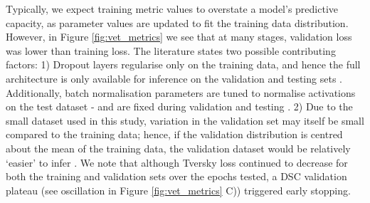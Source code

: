 Typically, we expect training metric values to overstate a model's predictive capacity, as parameter values are updated to fit the training data distribution. However, in Figure \ref{fig:vet_metrics} we see that at many stages, validation loss was lower than training loss.
The literature states two possible contributing factors: 1) Dropout layers regularise only on the training data, and hence the full architecture is only available for inference on the validation and testing sets \cite{srivastava2014}. Additionally, batch normalisation parameters are tuned to normalise activations on the test dataset - and are fixed during validation and testing \cite{CITATION}. 2) Due to the small dataset used in this study, variation in the validation set may itself be small compared to the training data; hence, if the validation distribution is centred about the mean of the training data, the validation dataset would be relatively `easier' to infer \cite{CITATION}. We note that although Tversky loss continued to decrease for both the training and validation sets over the epochs tested, a DSC validation plateau (see oscillation in Figure \ref{fig:vet_metrics} C)) triggered early stopping.

